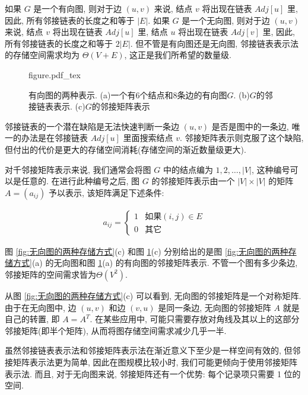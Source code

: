 \documentclass[oneside,10pt,fontset=none]{ctexbook}
\numberwithin{definition}{chapter}
\numberwithin{theorem}{chapter}
\numberwithin{lemma}{chapter}
\begin{document}
如果 $G$ 是一个有向图, 则对于边 $(u, v)$ 来说, 结点 $v$ 将出现在链表 $Adj[u]$ 里, 因此, 所有邻接链表的长度之和等于 $|E|$. 如果 $G$ 是一个无向图, 则对于边 $(u, v)$ 来说, 结点 $v$ 将出现在链表 $Adj[u]$ 里, 结点 $u$ 将出现在链表 $Adj[v]$ 里, 因此, 所有邻接链表的长度之和等于 $2|E|$. 但不管是有向图还是无向图, 邻接链表表示法的存储空间需求均为 $\Theta(V+E)$, 这正是我们所希望的数量级.

\begin{figure}[htbp]
    \def\svgwidth{\columnwidth}
    {figure.pdf_tex}
    \caption{有向图的两种表示. (a)一个有6个结点和8条边的有向图$G$. (b)$G$的邻接链表表示. (c)$G$的邻接矩阵表示}
    \label{fig:有向图的两种存储方式}
\end{figure}

邻接链表的一个潜在缺陷是无法快速判断一条边 $(u, v)$ 是否是图中的一条边, 唯一的办法是在邻接链表 $Adj[u]$ 里面搜索结点 $v$. 邻接矩阵表示则克服了这个缺陷, 但付出的代价是更大的存储空间消耗(存储空间的渐近数量级更大).

对千邻接矩阵表示来说, 我们通常会将图 $G$ 中的结点编为 $1, 2, \dots, |V|$, 这种编号可以是任意的. 在进行此种编号之后, 图 $G$ 的邻接矩阵表示由一个 $|V|\times |V|$ 的矩阵 $A=(a_{ij})$ 予以表示, 该矩阵满足下述条件:

\begin{equation*}\begin{split}
a_{ij}=\begin{cases}
    1  &\text{如果}(i,j)\in E \\
    0  &\text{其它}
\end{cases}
\end{split}\end{equation*}

图 \ref{fig:无向图的两种存储方式}(c) 和图 \ref{fig:有向图的两种存储方式}(c) 分别给出的是图 \ref{fig:无向图的两种存储方式}(a) 的无向图和图 \ref{fig:有向图的两种存储方式}(a) 的有向图的邻接矩阵表示. 不管一个图有多少条边, 邻接矩阵的空间需求皆为$\Theta(V^2)$.

从图 \ref{fig:无向图的两种存储方式}(c) 可以看到, 无向图的邻接矩阵是一个对称矩阵. 由于在无向图中, 边 $(u, v)$ 和边 $(v, u)$ 是同一条边, 无向图的邻接矩阵 $A$ 就是自己的转置, 即 $A=A^T$. 在某些应用中, 可能只需要存放对角线及其以上的这部分邻接矩阵(即半个矩阵), 从而将图存储空间需求减少几乎一半.

虽然邻接链表表示法和邻接矩阵表示法在渐近意义下至少是一样空间有效的, 但邻接矩阵表示法更为简单, 因此在图规模比较小时, 我们可能更倾向于使用邻接矩阵表示法. 而且, 对于无向图来说, 邻接矩阵还有一个优势: 每个记录项只需要 1 位的空间.
\end{document}
